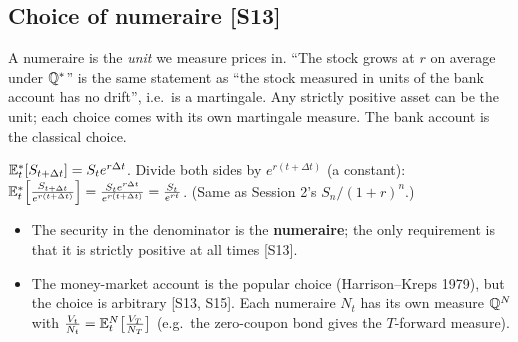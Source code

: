 \documentclass[10pt]{article}
\begin{document}
\subsection{Choice of numeraire [S13]}
\begin{idea}
A numeraire is the \emph{unit} we measure prices in. ``The stock grows at $r$ on average under $\mathbb{Q}^*$'' is the same statement as ``the stock measured in units of the bank account has no drift'', i.e.\ is a martingale. Any strictly positive asset can be the unit; each choice comes with its own martingale measure. The bank account is the classical choice.
\end{idea}
\begin{deriv}
$\mathbb{E}^*_t[S_{t+\Delta t}]=S_te^{r\Delta t}$. Divide both sides by $e^{r(t+\Delta t)}$ (a constant): $\mathbb{E}^*_t\Big[\frac{S_{t+\Delta t}}{e^{r(t+\Delta t)}}\Big]=\frac{S_te^{r\Delta t}}{e^{r(t+\Delta t)}}=\frac{S_t}{e^{rt}}$. (Same as Session 2's $S_n/(1+r)^n$.)
\end{deriv}
\begin{itemize}
\item The security in the denominator is the \textbf{numeraire}; the only requirement is that it is strictly positive at all times [S13].
\item The money-market account is the popular choice (Harrison--Kreps 1979), but the choice is arbitrary [S13, S15]. \beyond{} Each numeraire $N_t$ has its own measure $\mathbb{Q}^N$ with $\frac{V_t}{N_t}=\mathbb{E}^N_t\big[\frac{V_T}{N_T}\big]$ (e.g.\ the zero-coupon bond gives the $T$-forward measure).
\end{itemize}
\end{document}
